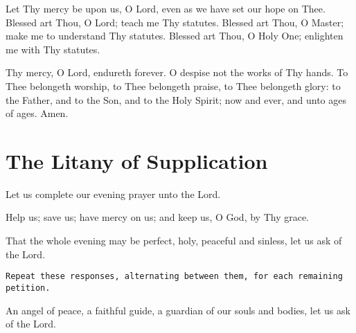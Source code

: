\documentclass[twoside, letterpaper, 12pt]{report}
\newcommand{\instruction}[1]{%
  \texttt{\scriptsize{#1}}%
}
\newcommand{\centeredsection}[1]{%
  \needspace{10\baselineskip}%
  \section*{\centering{}#1}%
}
\begin{document}
Let Thy mercy be upon us, O Lord, even as we have set our hope on Thee.
Blessed art Thou, O Lord; teach me Thy statutes. Blessed art Thou, O Master;
make me to understand Thy statutes.
Blessed art Thou, O Holy One; enlighten me with Thy statutes.

Thy mercy, O Lord, endureth forever. O despise not the works of Thy hands.
To Thee belongeth worship, to Thee belongeth praise, to Thee belongeth glory:
to the Father, and to the Son, and to the Holy Spirit;
now and ever, and unto ages of ages. Amen.

\centeredsection{The Litany of Supplication}

\begin{deacon}
\item Let us complete our evening prayer unto the Lord.
\end{deacon}

\begin{deacon}
\item Help us; save us; have mercy on us; and keep us, O God, by Thy grace.
\end{deacon}

\begin{deacon}
\item That the whole evening may be perfect, holy, peaceful and sinless,
    let us ask of the Lord.
\end{deacon}
\instruction{Repeat these responses, alternating between them, for each remaining petition.}


\begin{deacon}
\item An angel of peace, a faithful guide, a guardian of our souls and bodies,
    let us ask of the Lord.
\end{deacon}
\end{document}
